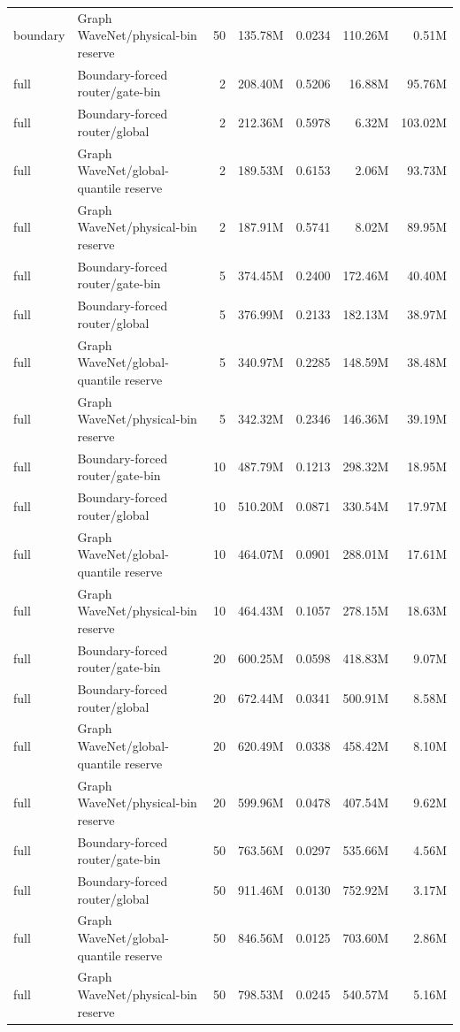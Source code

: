 \begin{tabular}{llrrrrr}
boundary & Graph WaveNet/physical-bin reserve & 50 & 135.78M & 0.0234 & 110.26M & 0.51M \\
full & Boundary-forced router/gate-bin & 2 & 208.40M & 0.5206 & 16.88M & 95.76M \\
full & Boundary-forced router/global & 2 & 212.36M & 0.5978 & 6.32M & 103.02M \\
full & Graph WaveNet/global-quantile reserve & 2 & 189.53M & 0.6153 & 2.06M & 93.73M \\
full & Graph WaveNet/physical-bin reserve & 2 & 187.91M & 0.5741 & 8.02M & 89.95M \\
full & Boundary-forced router/gate-bin & 5 & 374.45M & 0.2400 & 172.46M & 40.40M \\
full & Boundary-forced router/global & 5 & 376.99M & 0.2133 & 182.13M & 38.97M \\
full & Graph WaveNet/global-quantile reserve & 5 & 340.97M & 0.2285 & 148.59M & 38.48M \\
full & Graph WaveNet/physical-bin reserve & 5 & 342.32M & 0.2346 & 146.36M & 39.19M \\
full & Boundary-forced router/gate-bin & 10 & 487.79M & 0.1213 & 298.32M & 18.95M \\
full & Boundary-forced router/global & 10 & 510.20M & 0.0871 & 330.54M & 17.97M \\
full & Graph WaveNet/global-quantile reserve & 10 & 464.07M & 0.0901 & 288.01M & 17.61M \\
full & Graph WaveNet/physical-bin reserve & 10 & 464.43M & 0.1057 & 278.15M & 18.63M \\
full & Boundary-forced router/gate-bin & 20 & 600.25M & 0.0598 & 418.83M & 9.07M \\
full & Boundary-forced router/global & 20 & 672.44M & 0.0341 & 500.91M & 8.58M \\
full & Graph WaveNet/global-quantile reserve & 20 & 620.49M & 0.0338 & 458.42M & 8.10M \\
full & Graph WaveNet/physical-bin reserve & 20 & 599.96M & 0.0478 & 407.54M & 9.62M \\
full & Boundary-forced router/gate-bin & 50 & 763.56M & 0.0297 & 535.66M & 4.56M \\
full & Boundary-forced router/global & 50 & 911.46M & 0.0130 & 752.92M & 3.17M \\
full & Graph WaveNet/global-quantile reserve & 50 & 846.56M & 0.0125 & 703.60M & 2.86M \\
full & Graph WaveNet/physical-bin reserve & 50 & 798.53M & 0.0245 & 540.57M & 5.16M \\
\bottomrule
\end{tabular}
